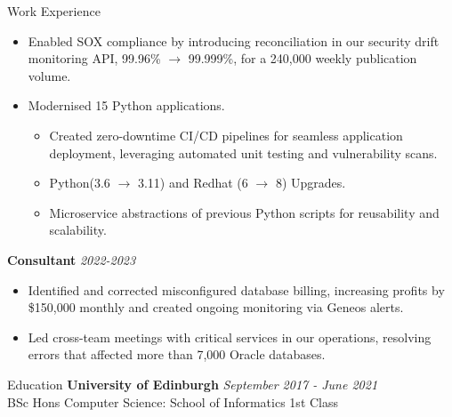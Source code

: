 \documentclass{resume} %
\begin{document}
\begin{rSection}{Work Experience}
        \begin{itemize}
            \item Enabled SOX compliance by introducing reconciliation in our security drift monitoring API, 99.96\% $\rightarrow$ 99.999\%, for a 240,000 weekly publication volume.
            \item Modernised 15 Python applications.
            \begin{itemize}
                \item Created zero-downtime CI/CD pipelines for seamless application deployment, leveraging automated unit testing and vulnerability scans.
                \item Python(3.6 $\rightarrow$ 3.11) and Redhat (6 $\rightarrow$ 8) Upgrades.
                \item Microservice abstractions of previous Python scripts for reusability and scalability.
            \end{itemize}
        \end{itemize}
        \textbf{Consultant} \hfill {\em 2022-2023}
        \begin{itemize}
            \item Identified and corrected misconfigured database billing, increasing profits by \$150,000 monthly and created ongoing monitoring via Geneos alerts.
            \item Led cross-team meetings with critical services in our operations, resolving errors that affected more than 7,000 Oracle databases.
        \end{itemize}

    \end{rSection}
    \begin{rSection}{Education}
    {\bf University of Edinburgh} \hfill {\em September 2017 - June 2021}
        \\ BSc Hons Computer Science: School of Informatics  \hfill {1st Class}
    \end{rSection}
\end{document}
